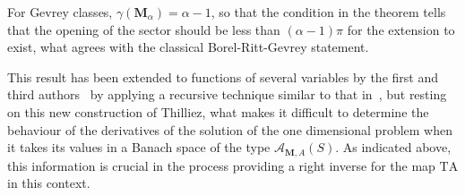 \documentclass[11pt,a4paper,leqno]{article}
\theoremstyle{plain}
\theoremstyle{definition}
\def\a{\alpha}
\def\ga{\gamma}
\def\bM{\boldsymbol{M}}
\begin{document}
For Gevrey classes, $\ga(\bM_{\a})=\a-1$, so that the condition in the theorem tells that the opening of the sector should be less than $(\a-1)\pi$ for the extension to exist,
what agrees with the classical Borel-Ritt-Gevrey statement.

This result has been extended to functions of several variables by the first and third authors~\cite{lastrasanz} by applying a recursive technique similar to that in~\cite{javier}, but resting on this new construction of Thilliez, what makes it difficult to determine the behaviour of the derivatives of the solution of the one dimensional problem when it takes its values in a Banach space of the type $\mathcal{A}_{\bM,A}(S)$. As indicated above, this information is crucial in the process providing a right inverse for the map $\mathrm{TA}$ in this context.
\end{document}
